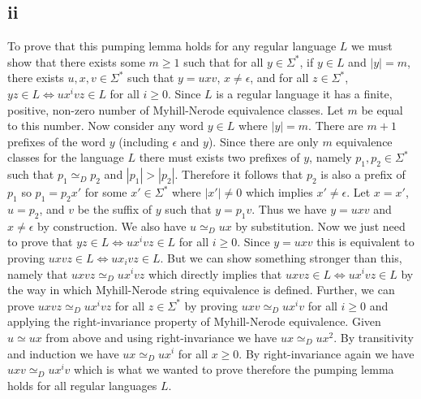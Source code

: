 \documentclass[12pt]{article}
\begin{document}
\subsection*{ii}
To prove that this pumping lemma holds for any regular language $L$ we must show
that there exists some $m \ge 1$ such that for all $y \in \Sigma^*$,
if $y \in L$ and $|y| = m$, there exists $u,x,v \in \Sigma^*$ such that
$y = uxv$, $x \neq \epsilon$, and for all $z \in \Sigma^*$,
$yz \in L \iff ux^ivz \in L$ for all $i \ge 0$. Since $L$ is a regular language
it has a finite, positive, non-zero number of Myhill-Nerode equivalence classes.
Let $m$ be equal to this number. Now consider any word $y \in L$ where $|y| = m$.
There are $m+1$ prefixes of the word $y$ (including $\epsilon$ and $y$). Since
there are only $m$ equivalence classes for the language $L$ there must exists
two prefixes of $y$, namely $p_1,p_2 \in \Sigma^*$ such that $p_1 \simeq_D p_2$
and $|p_1| > |p_2|$. Therefore it follows that $p_2$ is also a prefix of $p_1$
so $p_1 = p_2x'$ for some $x' \in \Sigma^*$ where $|x'| \neq 0$ which implies
$x' \neq \epsilon$. Let $x=x'$, $u=p_2$, and $v$ be the suffix of $y$
such that $y=p_1v$. Thus we have $y = uxv$ and $x \neq \epsilon$ by construction.
We also have $u \simeq_D ux$ by substitution. Now we just need to prove that
$yz \in L \iff ux^ivz \in L$ for all $i \ge 0$.
Since $y = uxv$ this is equivalent to proving $uxvz \in L \iff ux_ivz \in L$.
But we can show something stronger than this, namely that $uxvz \simeq_D ux^ivz$
which directly implies that $uxvz \in L \iff ux^ivz \in L$ by the way in which
Myhill-Nerode string equivalence is defined. Further, we can prove
$uxvz \simeq_D ux^ivz$ for all $z \in \Sigma^*$ by proving $uxv \simeq_D ux^iv$
for all $i \ge 0$ and applying the right-invariance property of Myhill-Nerode
equivalence. Given $u \simeq ux$ from above and using right-invariance we have
$ux \simeq_D ux^2$. By transitivity and induction we have $ux \simeq_D ux^i$
for all $x \ge 0$. By right-invariance again we have $uxv \simeq_D ux^iv$ which
is what we wanted to prove therefore the pumping lemma holds for all regular
languages $L$.
\end{document}

